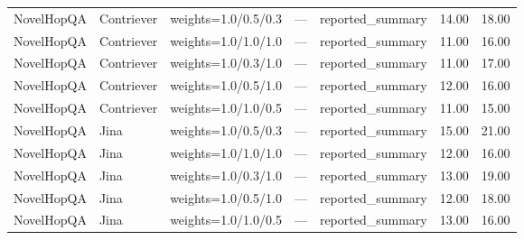 \begin{tabular}{lllllll}
NovelHopQA & Contriever & weights=1.0/0.5/0.3 & — & reported\_summary & 14.00 & 18.00 \\
NovelHopQA & Contriever & weights=1.0/1.0/1.0 & — & reported\_summary & 11.00 & 16.00 \\
NovelHopQA & Contriever & weights=1.0/0.3/1.0 & — & reported\_summary & 11.00 & 17.00 \\
NovelHopQA & Contriever & weights=1.0/0.5/1.0 & — & reported\_summary & 12.00 & 16.00 \\
NovelHopQA & Contriever & weights=1.0/1.0/0.5 & — & reported\_summary & 11.00 & 15.00 \\
NovelHopQA & Jina & weights=1.0/0.5/0.3 & — & reported\_summary & 15.00 & 21.00 \\
NovelHopQA & Jina & weights=1.0/1.0/1.0 & — & reported\_summary & 12.00 & 16.00 \\
NovelHopQA & Jina & weights=1.0/0.3/1.0 & — & reported\_summary & 13.00 & 19.00 \\
NovelHopQA & Jina & weights=1.0/0.5/1.0 & — & reported\_summary & 12.00 & 18.00 \\
NovelHopQA & Jina & weights=1.0/1.0/0.5 & — & reported\_summary & 13.00 & 16.00 \\
\hline
\end{tabular}
